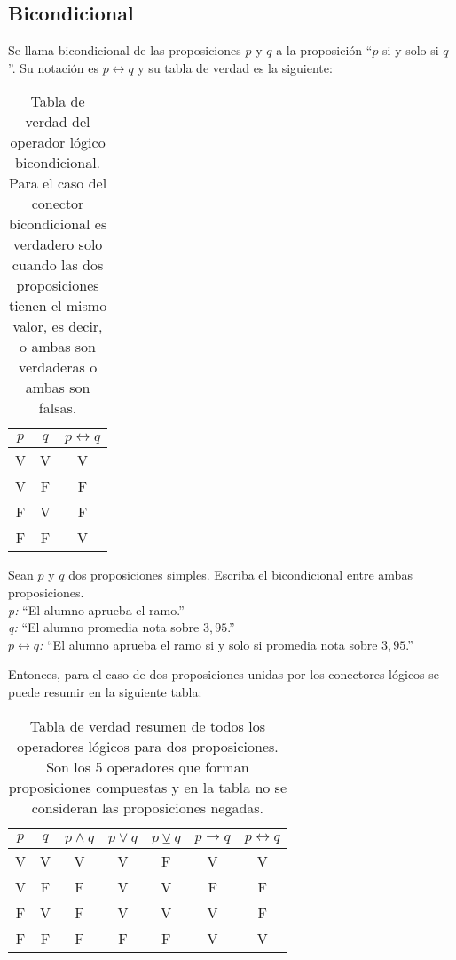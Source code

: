 \subsection{Bicondicional}
 Se llama bicondicional de las proposiciones $p$ y $q$ a la proposición ``$p$ si y solo si $q$''. Su notación es $p \longleftrightarrow q$ y su tabla de verdad es la siguiente:\\
\begin{table}[h!]
 	\begin{center}
		\begin{tabular}{|c|c|c|}
\hline
$p$&$q$&$p \longleftrightarrow q$\\
\hline
V&V&V\\
\hline
V&F&F\\
\hline
F&V&F\\
\hline
F&F&V\\
\hline
		\end{tabular}
	\end{center}
\caption[Tabla de verdad del operador lógico bicondicional.]{Tabla de verdad del operador lógico bicondicional. Para el caso del conector bicondicional es verdadero solo cuando las dos proposiciones tienen el mismo valor, es decir, o ambas son verdaderas o ambas son falsas.}
\end{table}
 
\begin{myexample}
Sean $p$ y $q$ dos proposiciones simples. Escriba el bicondicional entre ambas proposiciones.\\

 \noindent\textit{p:} ``El alumno aprueba el ramo.''\\
\textit{q:} ``El alumno promedia nota sobre $3,95$.''\\
\textit{$p\longleftrightarrow q$:} ``El alumno aprueba el ramo si y solo si promedia nota sobre $3,95$.''\\

\end{myexample} 
 
Entonces, para el caso de dos proposiciones unidas por los conectores lógicos se puede resumir en la siguiente tabla:

\begin{table}[h!]
	\begin{center}
		\begin{tabular}{||c|c||c|c|c|c|c||}
\hline
\hline
$p$&$q$&$p\wedge q$&$p\vee q$&$p\veebar q$&$p\rightarrow q$&$p\longleftrightarrow q$\\
\hline
V&V&V&V&F&V&V\\
\hline
V&F&F&V&V&F&F\\
\hline
F&V&F&V&V&V&F\\
\hline
F&F&F&F&F&V&V\\
\hline
\hline
		\end{tabular}
	\end{center}
\caption[Tabla de verdad resumen de todos los operadores lógicos.]{Tabla de verdad resumen de todos los operadores lógicos para dos proposiciones. Son los 5 operadores que forman proposiciones compuestas y en la tabla no se consideran las proposiciones negadas.}
\end{table}
 
